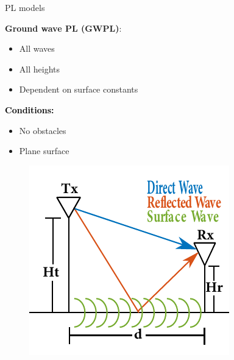 \documentclass[10pt]{beamer}
\begin{document}
\begin{frame}{PL models}
\begin{minipage}{.45\textwidth}
\raggedright\textcolor{thomaspurple}{\textbf{Ground wave PL (GWPL)}:}
\begin{itemize}
\item All waves
\item All heights
\item Dependent on surface constants
\end{itemize} 

\vspace{1em}
\textcolor{black}{\textbf{Conditions:}}
\begin{itemize}
\item No obstacles
\item Plane surface
\end{itemize}

\end{minipage}
\begin{minipage}{0.5\textwidth}
\begin{figure}[!htbp]
 \centering
  \includegraphics[width = \columnwidth]{figures/poster_cropped_1.pdf}
  \end{figure}
\end{minipage}


\end{frame}
\end{document}
